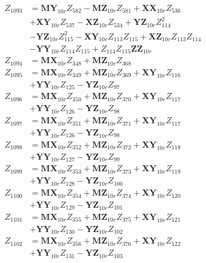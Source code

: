 \begin{multicols}{2}
\begin{align}
Z_{1093} &= \mathbf{MY}_{10r}Z_{582} - \mathbf{MZ}_{10r}Z_{581} + \mathbf{XX}_{10r}Z_{536}  \nonumber \\
&+ \mathbf{XY}_{10r}Z_{537} - \mathbf{XZ}_{10r}Z_{534} + \mathbf{YZ}_{10r}Z_{114}^2  \nonumber \\
&- \mathbf{YZ}_{10r}Z_{115}^2 - \mathbf{XY}_{10r}Z_{113}Z_{115} + \mathbf{XZ}_{10r}Z_{113}Z_{114}  \nonumber \\
&- \mathbf{YY}_{10r}Z_{114}Z_{115} + Z_{114}Z_{115}\mathbf{ZZ}_{10r} \nonumber \\
Z_{1094} &= \mathbf{MX}_{10r}Z_{348} + \mathbf{MZ}_{10r}Z_{368} \nonumber \\
Z_{1095} &= \mathbf{MX}_{10r}Z_{349} + \mathbf{MZ}_{10r}Z_{369} + \mathbf{XY}_{10r}Z_{116}  \nonumber \\
&+ \mathbf{YY}_{10r}Z_{125} - \mathbf{YZ}_{10r}Z_{97} \nonumber \\
Z_{1096} &= \mathbf{MX}_{10r}Z_{350} + \mathbf{MZ}_{10r}Z_{370} + \mathbf{XY}_{10r}Z_{117}  \nonumber \\
&+ \mathbf{YY}_{10r}Z_{126} - \mathbf{YZ}_{10r}Z_{98} \nonumber \\
Z_{1097} &= \mathbf{MX}_{10r}Z_{351} + \mathbf{MZ}_{10r}Z_{371} + \mathbf{XY}_{10r}Z_{117}  \nonumber \\
&+ \mathbf{YY}_{10r}Z_{126} - \mathbf{YZ}_{10r}Z_{98} \nonumber \\
Z_{1098} &= \mathbf{MX}_{10r}Z_{352} + \mathbf{MZ}_{10r}Z_{372} + \mathbf{XY}_{10r}Z_{118}  \nonumber \\
&+ \mathbf{YY}_{10r}Z_{127} - \mathbf{YZ}_{10r}Z_{99} \nonumber \\
Z_{1099} &= \mathbf{MX}_{10r}Z_{353} + \mathbf{MZ}_{10r}Z_{373} + \mathbf{XY}_{10r}Z_{119}  \nonumber \\
&+ \mathbf{YY}_{10r}Z_{128} - \mathbf{YZ}_{10r}Z_{100} \nonumber \\
Z_{1100} &= \mathbf{MX}_{10r}Z_{354} + \mathbf{MZ}_{10r}Z_{374} + \mathbf{XY}_{10r}Z_{120}  \nonumber \\
&+ \mathbf{YY}_{10r}Z_{129} - \mathbf{YZ}_{10r}Z_{101} \nonumber \\
Z_{1101} &= \mathbf{MX}_{10r}Z_{355} + \mathbf{MZ}_{10r}Z_{375} + \mathbf{XY}_{10r}Z_{121}  \nonumber \\
&+ \mathbf{YY}_{10r}Z_{130} - \mathbf{YZ}_{10r}Z_{102} \nonumber \\
Z_{1102} &= \mathbf{MX}_{10r}Z_{356} + \mathbf{MZ}_{10r}Z_{376} + \mathbf{XY}_{10r}Z_{122}  \nonumber \\
&+ \mathbf{YY}_{10r}Z_{131} - \mathbf{YZ}_{10r}Z_{103} \nonumber \\

\end{align}
\end{multicols}
